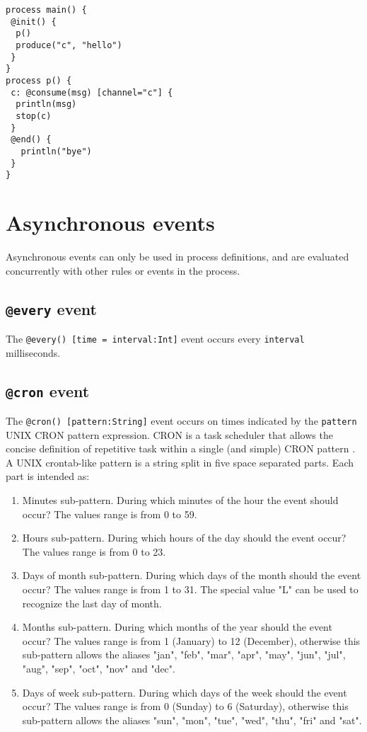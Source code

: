 \documentclass[11pt]{report}
\begin{document}
\begin{lstlisting}
process main() {
 @init() {
  p()
  produce("c", "hello")
 }
}
process p() {
 c: @consume(msg) [channel="c"] {
  println(msg)
  stop(c)
 }
 @end() {
   println("bye")
 }
}
\end{lstlisting}

\section{Asynchronous events\label{sec:asynchronous_events}}

Asynchronous events can only be used in process definitions, and are evaluated concurrently with other rules or events in the process. 

\subsection{\texttt{@every} event}

The \texttt{@every() [time = interval:Int]} event occurs every \texttt{interval} milliseconds.

\subsection{\texttt{@cron} event}

The \texttt{@cron() [pattern:String]} event occurs on times indicated by the \texttt{pattern} UNIX CRON pattern expression. CRON is a task scheduler that allows the concise definition of repetitive task within a single (and simple) CRON pattern \cite{franta1977}. A UNIX crontab-like pattern is a string split in five space separated parts. Each part is intended as:

\begin{enumerate}
\item Minutes sub-pattern. During which minutes of the hour the event should occur? The values range is from 0 to 59.
\item Hours sub-pattern. During which hours of the day should the event occur? The values range is from 0 to 23.
\item Days of month sub-pattern. During which days of the month should the event occur? The values range is from 1 to 31. The special value "L" can be used to recognize the last day of month.
\item Months sub-pattern. During which months of the year should the event occur? The values range is from 1 (January) to 12 (December), otherwise this sub-pattern allows the aliases "jan", "feb", "mar", "apr", "may", "jun", "jul", "aug", "sep", "oct", "nov" and "dec".
\item Days of week sub-pattern. During which days of the week should the event occur? The values range is from 0 (Sunday) to 6 (Saturday), otherwise this sub-pattern allows the aliases "sun", "mon", "tue", "wed", "thu", "fri" and "sat".
\end{enumerate}
\end{document}
